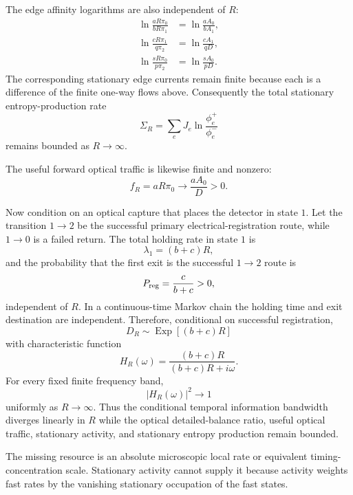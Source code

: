 The edge affinity logarithms are also independent of $R$:
\begin{align}
\ln\frac{aR\pi_0}{bR\pi_1}
&=\ln\frac{aA_0}{bA_1},\\
\ln\frac{cR\pi_1}{q\pi_2}
&=\ln\frac{cA_1}{qD},\\
\ln\frac{sR\pi_0}{p\pi_2}
&=\ln\frac{sA_0}{pD}.
\end{align}
The corresponding stationary edge currents remain finite because each is a difference of the finite one-way flows above.  Consequently the total stationary entropy-production rate
\begin{equation}
\Sigma_R
=\sum_{e}J_e\ln\frac{\phi_e^+}{\phi_e^-}
\end{equation}
remains bounded as $R\to\infty$.

The useful forward optical traffic is likewise finite and nonzero:
\begin{equation}
f_R=aR\pi_0
\longrightarrow\frac{aA_0}{D}>0.
\end{equation}

Now condition on an optical capture that places the detector in state $1$.  Let the transition $1\to2$ be the successful primary electrical-registration route, while $1\to0$ is a failed return.  The total holding rate in state $1$ is
\begin{equation}
\lambda_1=(b+c)R,
\end{equation}
and the probability that the first exit is the successful $1\to2$ route is
\begin{equation}
P_{\rm reg}=\frac{c}{b+c}>0,
\end{equation}
independent of $R$.  In a continuous-time Markov chain the holding time and exit destination are independent.  Therefore, conditional on successful registration,
\begin{equation}
D_R\sim\operatorname{Exp}[(b+c)R]
\end{equation}
with characteristic function
\begin{equation}
H_R(\omega)
=\frac{(b+c)R}{(b+c)R+i\omega}.
\end{equation}
For every fixed finite frequency band,
\begin{equation}
|H_R(\omega)|^2\to1
\end{equation}
uniformly as $R\to\infty$.  Thus the conditional temporal information bandwidth diverges linearly in $R$ while the optical detailed-balance ratio, useful optical traffic, stationary activity, and stationary entropy production remain bounded.

The missing resource is an absolute microscopic local rate or equivalent timing-concentration scale.  Stationary activity cannot supply it because activity weights fast rates by the vanishing stationary occupation of the fast states.